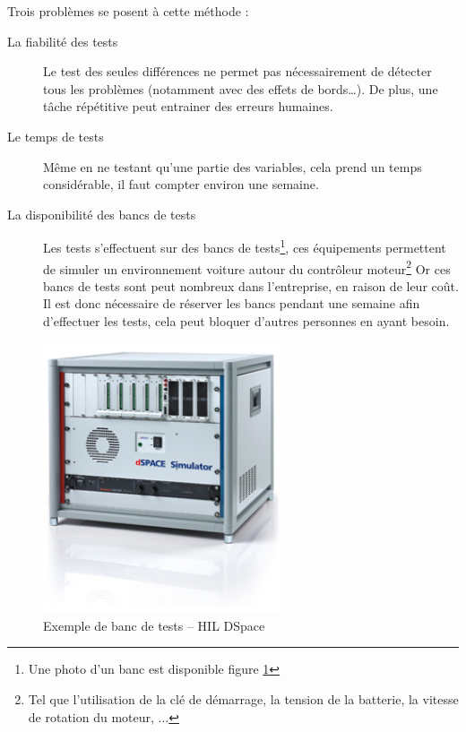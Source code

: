 	Trois problèmes se posent à cette méthode : 
	\begin{description}
		\item[La fiabilité des tests] Le test des seules différences ne permet pas nécessairement de détecter tous les problèmes (notamment avec des effets de bords…). De plus, une tâche répétitive peut entrainer des erreurs humaines.
		\item[Le temps de tests] Même en ne testant qu'une partie des variables, cela prend un temps considérable, il faut compter environ une semaine.
		\item[La disponibilité des bancs de tests]	Les tests s'effectuent sur des bancs de tests\footnote{Une photo d'un banc est disponible figure \ref{fig:photoHil}}, ces équipements permettent de simuler un environnement voiture autour du contrôleur moteur\footnote{Tel que l'utilisation de la clé de démarrage, la tension de la batterie, la vitesse de rotation du moteur, ...} Or ces bancs de tests sont peut nombreux dans l'entreprise, en raison de leur coût. Il est donc nécessaire de réserver les bancs pendant une semaine afin d'effectuer les tests, cela peut bloquer d'autres personnes en ayant besoin.
	\end{description}
	\begin{figure}[H]
		\centering
		\includegraphics[width=7cm]{contents/images/hil.jpg}
		\caption{Exemple de banc de tests -- HIL DSpace}
		\label{fig:photoHil}
	\end{figure}


